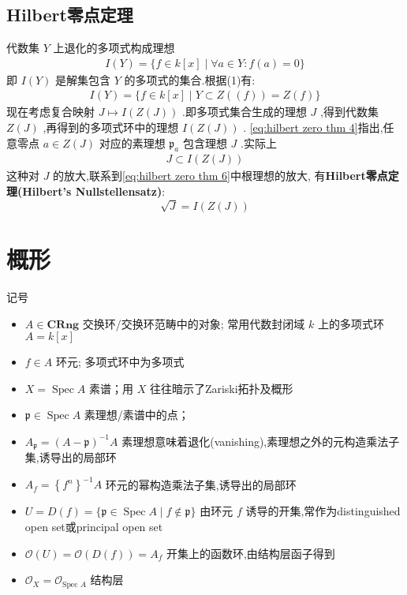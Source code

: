 \subsection{Hilbert零点定理}
代数集 $Y$ 上退化的多项式构成理想
\begin{align*}
I(Y)=\{f \in k[x] \mid \forall a \in Y: f(a)=0\}
\end{align*}
即 $I(Y)$ 是解集包含 $Y$ 的多项式的集合.根据(1)有:
\begin{align*}
I(Y)=\{f \in k[x] \mid Y \subset Z((f))=Z(f)\}
\end{align*}
现在考虑复合映射 $J \mapsto I(Z(J))$ .即多项式集合生成的理想 $J$ ,得到代数集 $Z(J)$ ,再得到的多项式环中的理想 $I(Z(J))$ .
\eqref{eq:hilbert zero thm 4}指出,任意零点 $a \in Z(J)$ 对应的素理想 $\mathfrak{p}_a$ 包含理想 $J$ .实际上
\begin{align*}
J \subset I(Z(J))
\end{align*}
这种对 $J$ 的放大,联系到\eqref{eq:hilbert zero thm 6}中根理想的放大, 有\textbf{Hilbert零点定理(Hilbert's Nullstellensatz)}:
\begin{equation}\label{eq:hilbert zero thm 7}
\sqrt{J}=I(Z(J))
\end{equation}

\section{概形}
{\kaishu 记号}

\begin{itemize}
  \item $A \in \mathbf{C R n g}$ 交换环/交换环范畴中的对象; 常用代数封闭域 $k$ 上的多项式环 $A=k[x]$
  \item $f \in A$ 环元; 多项式环中为多项式
  \item $X=\operatorname{Spec} A$ 素谱；用 $X$ 往往暗示了Zariski拓扑及概形
  \item $\mathfrak{p} \in \operatorname{Spec} A$ 素理想/素谱中的点；
  \item $A_{\mathfrak{p}}=(A-\mathfrak{p})^{-1} A$ 素理想意味着退化(vanishing),素理想之外的元构造乘法子集,诱导出的局部环
  \item $A_f=\left\{f^n\right\}^{-1} A$ 环元的幂构造乘法子集,诱导出的局部环
  \item $U=D(f)=\{\mathfrak{p} \in \operatorname{Spec} A \mid f \notin \mathfrak{p}\}$ 由环元 $f$ 诱导的开集,常作为distinguished open set或principal open set
  \item $\mathcal{O}(U)=\mathcal{O}(D(f))=A_f$ 开集上的函数环,由结构层函子得到
  \item $\mathcal{O}_X=\mathcal{O}_{\text {Spec } A}$ 结构层
\end{itemize}
